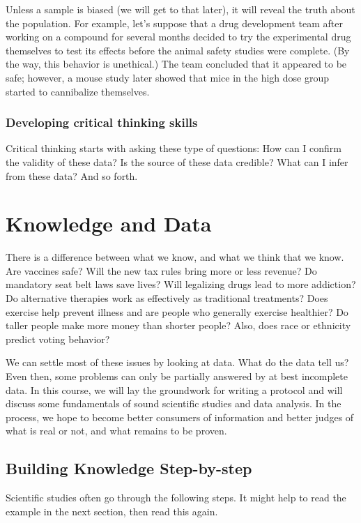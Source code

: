 \documentclass[11pt]{book}\usepackage[]{graphicx}\usepackage[]{color}
\begin{document}
Unless a sample is biased (we will get to that later), it will reveal the truth about the population.  For example, let's suppose that a drug development team after working on a compound for several months decided to try the experimental drug themselves to test its effects before the animal safety studies were complete.  (By the way, this behavior is unethical.)  The team concluded that it appeared to be safe; however, a mouse study later showed that mice in the high dose group started to cannibalize themselves.   

\subsubsection{Developing critical thinking skills}

Critical thinking starts with asking these type of questions: How can I confirm the validity of these data? Is the source of these data credible?  What can I infer from these data?  And so forth.

\section{Knowledge and Data}

There is a difference between what we know, and what we think that we know.  Are vaccines safe?  Will the new tax rules bring more or less revenue?  Do mandatory seat belt laws save lives?   Will legalizing drugs lead to more addiction?  Do alternative therapies work as effectively as traditional treatments?  Does exercise help prevent illness and are people who generally exercise healthier? Do taller people make more money than shorter people?  \citep{naranjo2018} Also, does race or ethnicity predict voting behavior?

We can settle most of these issues by looking at data.  What do the data tell us?  Even then, some problems can only be partially answered by at best incomplete data.  In this course, we will lay the groundwork for writing a protocol and  will discuss some fundamentals of sound scientific studies and data analysis.  In the process, we hope to become better consumers of information and better judges of what is real or not, and what remains to be proven.

\subsection{Building Knowledge Step-by-step}

Scientific studies often go through the following steps.  It might help to read the example in the next section, then read this again.
\end{document}

